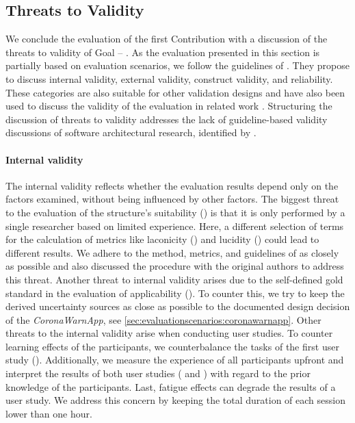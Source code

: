 \subsection{Threats to Validity}

We conclude the evaluation of the first Contribution  with a discussion of the threats to validity of Goal  -- .
As the evaluation presented in this section is partially based on evaluation scenarios, we follow the guidelines of \textcite{runeson_guidelines_2009}.
They propose to discuss internal validity, external validity, construct validity, and reliability.
These categories are also suitable for other validation designs and have also been used to discuss the validity of the evaluation in related work \cite{walter_context-based_2023,seifermann_architectural_2022}.
Structuring the discussion of threats to validity addresses the lack of guideline-based validity discussions of software architectural research, identified by \textcite{konersmann_evaluation_2022}.

\paragraph*{Internal validity}
The internal validity reflects whether the evaluation results depend only on the factors examined, without being influenced by other factors.
The biggest threat to the evaluation of the structure's suitability () is that it is only performed by a single researcher based on limited experience.
Here, a different selection of terms for the calculation of metrics like laconicity () and lucidity () could lead to different results.
We adhere to the method, metrics, and guidelines of \textcite{kaplan_introducing_2022} as closely as possible and also discussed the procedure with the original authors to address this threat.
Another threat to internal validity arises due to the self-defined gold standard in the evaluation of applicability ().
To counter this, we try to keep the derived uncertainty sources as close as possible to the documented design decision of the \emph{CoronaWarnApp}, see \autoref{sec:evaluationscenarios:coronawarnapp}.
Other threats to the internal validity arise when conducting user studies.
To counter learning effects of the participants, we counterbalance the tasks of the first user study ().
Additionally, we measure the experience of all participants upfront and interpret the results of both user studies ( and ) with regard to the prior knowledge of the participants.
Last, fatigue effects can degrade the results of a user study.
We address this concern by keeping the total duration of each session lower than one hour.


